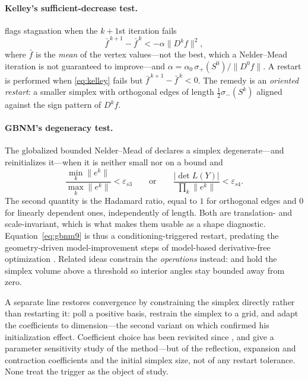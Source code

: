 \documentclass[11pt,a4paper]{article}
\begin{document}
\paragraph{Kelley's sufficient-decrease test.}
\citet{kelley1999} flags stagnation when the $k+1$st iteration fails
\begin{equation}
  \bar f^{\,k+1} - \bar f^{\,k} < -\alpha \lVert D^k f\rVert^2 ,
  \label{eq:kelley}
\end{equation}
where $\bar f$ is the \emph{mean} of the vertex values---not the best, which a
Nelder--Mead iteration is not guaranteed to improve---and
$\alpha = \alpha_0\,\sigma_+(S^0)/\lVert D^0 f\rVert$. A restart is performed
when \eqref{eq:kelley} fails but $\bar f^{\,k+1}-\bar f^{\,k}<0$. The remedy is
an \emph{oriented restart}: a smaller simplex with orthogonal edges of length
$\tfrac12\sigma_-(S^k)$ aligned against the sign pattern of $D^k f$.

\paragraph{GBNM's degeneracy test.}
The globalized bounded Nelder--Mead of \citet{luersen2004} declares a simplex
degenerate---and reinitializes it---when it is neither small nor on a bound and
\begin{equation}
  \frac{\min_k \lVert e^k\rVert}{\max_k \lVert e^k\rVert} < \varepsilon_{s3}
  \qquad\text{or}\qquad
  \frac{\lvert \det L(Y)\rvert}{\prod_k \lVert e^k\rVert} < \varepsilon_{s4}.
  \label{eq:gbnm9}
\end{equation}
The second quantity is the Hadamard ratio, equal to $1$ for orthogonal edges and
$0$ for linearly dependent ones, independently of length. Both are translation-
and scale-invariant, which is what makes them usable as a shape diagnostic.
Equation~\eqref{eq:gbnm9} is thus a conditioning-triggered restart, predating the
geometry-driven model-improvement steps of model-based derivative-free
optimization \citep{conn2009}. Related ideas constrain the \emph{operations}
instead: \citet{tseng2000} and \citet{nazareth2002} hold the simplex volume above
a threshold so interior angles stay bounded away from zero.

A separate line restores convergence by constraining the simplex directly rather
than restarting it: \citet{price2002} poll a positive basis, \citet{burmen2006}
restrain the simplex to a grid, and \citet{gao2012} adapt the coefficients to
dimension---the second variant on which \citet{wessing2019} confirmed his
initialization effect. Coefficient choice has been revisited since
\citet{barton1996}, and \citet{wang2011} give a parameter sensitivity study of
the method---but of the reflection, expansion and contraction coefficients and
the initial simplex size, not of any restart tolerance. None treat the trigger as
the object of study.
\end{document}

